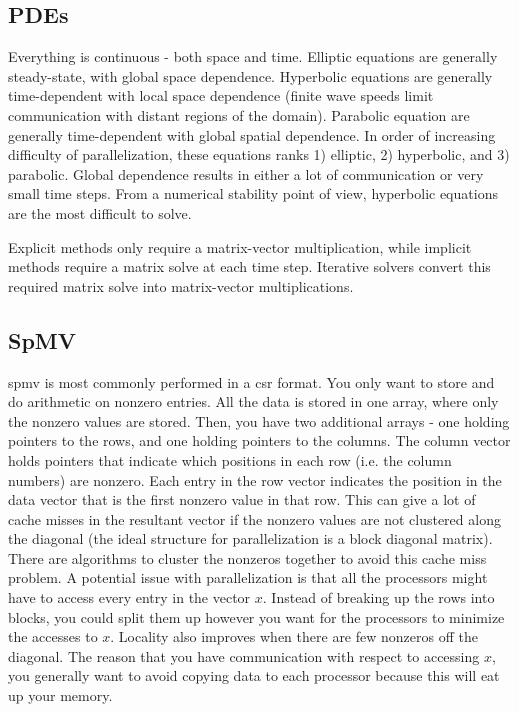 \documentclass[10pt]{article}
\begin{document}
\begin{flushleft}
\subsection{PDEs}

Everything is continuous - both space and time. Elliptic equations are generally steady-state, with global space dependence. Hyperbolic equations are generally time-dependent with local space dependence (finite wave speeds limit communication with distant regions of the domain). Parabolic equation are generally time-dependent with global spatial dependence. In order of increasing difficulty of parallelization, these equations ranks 1) elliptic, 2) hyperbolic, and 3) parabolic. Global dependence results in either a lot of communication or very small time steps. From a numerical stability point of view, hyperbolic equations are the most difficult to solve. 

Explicit methods only require a matrix-vector multiplication, while implicit methods require a matrix solve at each time step. Iterative solvers convert this required matrix solve into matrix-vector multiplications.

\subsection{SpMV}

\gls{spmv} is most commonly performed in a \gls{csr} format. You only want to store and do arithmetic on nonzero entries. All the data is stored in one array, where only the nonzero values are stored. Then, you have two additional arrays - one holding pointers to the rows, and one holding pointers to the columns. The column vector holds pointers that indicate which positions in each row (i.e. the column numbers) are nonzero. Each entry in the row vector indicates the position in the data vector that is the first nonzero value in that row. This can give a lot of cache misses in the resultant vector if the nonzero values are not clustered along the diagonal (the ideal structure for parallelization is a block diagonal matrix). There are algorithms to cluster the nonzeros together to avoid this cache miss problem. A potential issue with parallelization is that all the processors might have to access every entry in the vector \(x\). Instead of breaking up the rows into blocks, you could split them up however you want for the processors to minimize the accesses to \(x\). Locality also improves when there are few nonzeros off the diagonal. The reason that you have communication with respect to accessing \(x\), you generally want to avoid copying data to each processor because this will eat up your memory.


\end{flushleft}
\end{document}
